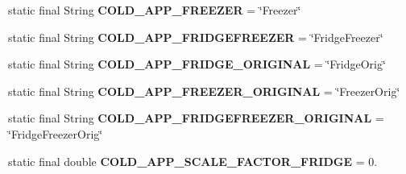 \begin{DoxyCompactItemize}
\item 
\hypertarget{classuk_1_1ac_1_1dmu_1_1iesd_1_1cascade_1_1base_1_1_consts_aeec1ea36004198f956162ef519647d8d}{static final String {\bfseries C\-O\-L\-D\-\_\-\-A\-P\-P\-\_\-\-F\-R\-E\-E\-Z\-E\-R} = \char`\"{}Freezer\char`\"{}}\label{classuk_1_1ac_1_1dmu_1_1iesd_1_1cascade_1_1base_1_1_consts_aeec1ea36004198f956162ef519647d8d}

\item 
\hypertarget{classuk_1_1ac_1_1dmu_1_1iesd_1_1cascade_1_1base_1_1_consts_a05bdb67457bba006893c30675c7accb2}{static final String {\bfseries C\-O\-L\-D\-\_\-\-A\-P\-P\-\_\-\-F\-R\-I\-D\-G\-E\-F\-R\-E\-E\-Z\-E\-R} = \char`\"{}Fridge\-Freezer\char`\"{}}\label{classuk_1_1ac_1_1dmu_1_1iesd_1_1cascade_1_1base_1_1_consts_a05bdb67457bba006893c30675c7accb2}

\item 
\hypertarget{classuk_1_1ac_1_1dmu_1_1iesd_1_1cascade_1_1base_1_1_consts_a459b9f8681d6146461dc8a9e2b4d075d}{static final String {\bfseries C\-O\-L\-D\-\_\-\-A\-P\-P\-\_\-\-F\-R\-I\-D\-G\-E\-\_\-\-O\-R\-I\-G\-I\-N\-A\-L} = \char`\"{}Fridge\-Orig\char`\"{}}\label{classuk_1_1ac_1_1dmu_1_1iesd_1_1cascade_1_1base_1_1_consts_a459b9f8681d6146461dc8a9e2b4d075d}

\item 
\hypertarget{classuk_1_1ac_1_1dmu_1_1iesd_1_1cascade_1_1base_1_1_consts_a00c3c5d40727d8c01bb135ad8dce6fb4}{static final String {\bfseries C\-O\-L\-D\-\_\-\-A\-P\-P\-\_\-\-F\-R\-E\-E\-Z\-E\-R\-\_\-\-O\-R\-I\-G\-I\-N\-A\-L} = \char`\"{}Freezer\-Orig\char`\"{}}\label{classuk_1_1ac_1_1dmu_1_1iesd_1_1cascade_1_1base_1_1_consts_a00c3c5d40727d8c01bb135ad8dce6fb4}

\item 
\hypertarget{classuk_1_1ac_1_1dmu_1_1iesd_1_1cascade_1_1base_1_1_consts_a7032c548eadd723a88ce22c6155d0394}{static final String {\bfseries C\-O\-L\-D\-\_\-\-A\-P\-P\-\_\-\-F\-R\-I\-D\-G\-E\-F\-R\-E\-E\-Z\-E\-R\-\_\-\-O\-R\-I\-G\-I\-N\-A\-L} = \char`\"{}Fridge\-Freezer\-Orig\char`\"{}}\label{classuk_1_1ac_1_1dmu_1_1iesd_1_1cascade_1_1base_1_1_consts_a7032c548eadd723a88ce22c6155d0394}

\item 
\hypertarget{classuk_1_1ac_1_1dmu_1_1iesd_1_1cascade_1_1base_1_1_consts_afff26fd8f2ce1e73724c1567896b1a10}{static final double {\bfseries C\-O\-L\-D\-\_\-\-A\-P\-P\-\_\-\-S\-C\-A\-L\-E\-\_\-\-F\-A\-C\-T\-O\-R\-\_\-\-F\-R\-I\-D\-G\-E} = 0.}\label{classuk_1_1ac_1_1dmu_1_1iesd_1_1cascade_1_1base_1_1_consts_afff26fd8f2ce1e73724c1567896b1a10}


\end{DoxyCompactItemize}
